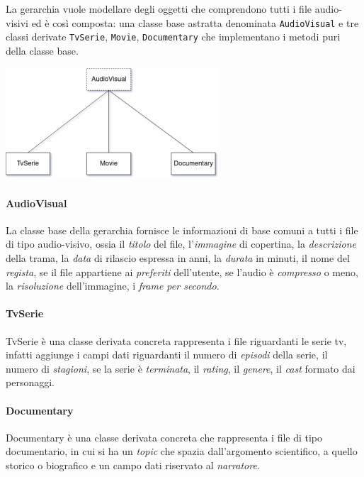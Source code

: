 La gerarchia vuole modellare degli oggetti che comprendono tutti i file audio-visivi ed è così composta: una classe base astratta denominata \texttt{AudioVisual} e tre classi derivate \texttt{TvSerie}, \texttt{Movie}, \texttt{Documentary} che implementano i metodi puri della classe base. 

\begin{center}
    \includegraphics[width=0.6\textwidth]{gerarchia}
\end{center}

\paragraph{AudioVisual}
La classe base della gerarchia fornisce le informazioni di base comuni a tutti i file di tipo audio-visivo, ossia il \textit{titolo} del file, l'\textit{immagine} di copertina, la \textit{descrizione} della trama, la \textit{data} di rilascio espressa in anni, la \textit{durata} in minuti, il nome del \textit{regista}, se il file appartiene ai \textit{preferiti} dell'utente, se l'audio è \textit{compresso} o meno, la \textit{risoluzione} dell'immagine, i \textit{frame per secondo}.

\paragraph{TvSerie}
TvSerie è una classe derivata concreta rappresenta i file riguardanti le serie tv, infatti aggiunge i campi dati riguardanti il numero di \textit{episodi} della serie, il numero di \textit{stagioni}, se la serie è \textit{terminata}, il \textit{rating}, il \textit{genere}, il \textit{cast} formato dai personaggi.

\paragraph{Documentary}
Documentary è una classe derivata concreta che rappresenta i file di tipo documentario, in cui si ha un \textit{topic} che spazia dall'argomento scientifico, a quello storico o biografico e un campo dati riservato al \textit{narratore}.

